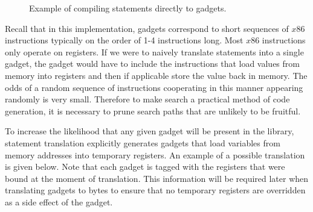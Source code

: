     \begin{figure}
        \centering
        \caption{Example of compiling statements directly to gadgets.}
        \label{fig:method-direct-to-gadget}
    \end{figure}

    Recall that in this implementation, gadgets correspond to short sequences of
    $x86$ instructions typically on the order of 1-4 instructions long. Most
    $x86$ instructions only operate on registers. If we were to naively
    translate statements into a single gadget, the gadget would have to include
    the instructions that load values from memory into registers and then if
    applicable store the value back in memory. The odds of a random sequence of
    instructions cooperating in this manner appearing randomly is very small.
    Therefore to make search a practical method of code generation, it is
    necessary to prune search paths that are unlikely to be fruitful.

    To increase the likelihood that any given gadget will be present in the
    library, statement translation explicitly generates gadgets that load
    variables from memory addresses into temporary registers. An example of a
    possible translation is given below. Note that each gadget is tagged with
    the registers that were bound at the moment of translation. This information
    will be required later when translating gadgets to bytes to ensure that no
    temporary registers are overridden as a side effect of the gadget.

